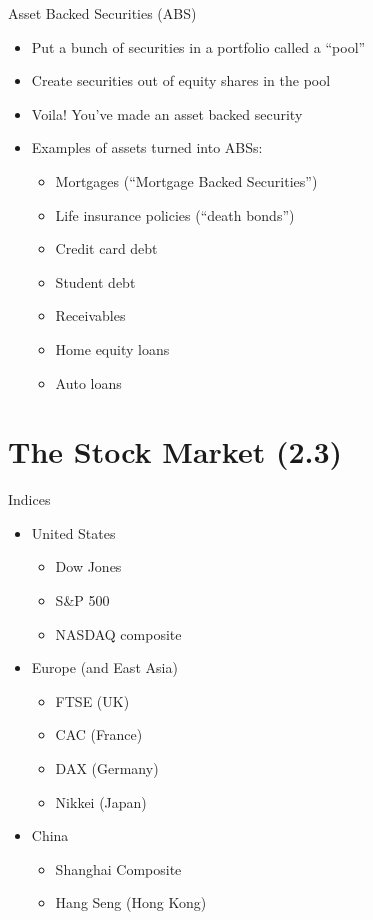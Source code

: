 \documentclass{beamer}
\begin{document}
\begin{frame}{Asset Backed Securities (ABS)}
	\begin{itemize}
		\item Put a bunch of securities in a portfolio called a ``pool''
		\item Create securities out of equity shares in the pool
		\item Voila! You've made an asset backed security
		\item Examples of assets turned into ABSs:
		\begin{itemize}
			\item Mortgages (``Mortgage Backed Securities'')
			\item Life insurance policies (``death bonds'')
			\item Credit card debt
			\item Student debt
			\item Receivables
			\item Home equity loans
			\item Auto loans
		\end{itemize}
	\end{itemize}
\end{frame}

\section{The Stock Market (2.3)}

\begin{frame}{Indices}
	\begin{itemize}
		\item United States
		\begin{itemize}
			\item Dow Jones 
			\item S\&P 500
			\item NASDAQ composite
		\end{itemize}
		\item Europe (and East Asia)
		\begin{itemize}
			\item FTSE (UK)
			\item CAC (France)
			\item DAX (Germany)
			\item Nikkei (Japan)
		\end{itemize}
		\item China
		\begin{itemize}
			\item Shanghai Composite
			\item Hang Seng (Hong Kong)
		\end{itemize}
	\end{itemize}
\end{frame}
\end{document}
